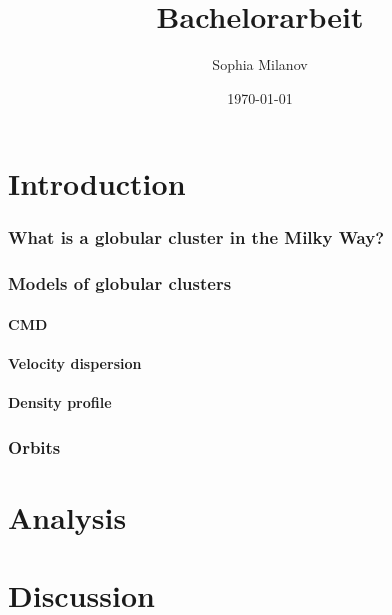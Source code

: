 \documentclass[a4paper,12pt,abstracton]{scrartcl}
\title{Bachelorarbeit}
\author{Sophia Milanov}
\date{\today}
\begin{document}


\begin{abstract}
\Blindtext 
\end{abstract}

\newpage

\tableofcontents


\part{Introduction}
\section{What is a globular cluster in the Milky Way?}
\section{Models of globular clusters}
\subsection{CMD}
\subsection{Velocity dispersion}
\subsection{Density profile}
\section{Orbits}
\part{Analysis}
\part{Discussion}
\end{document}
